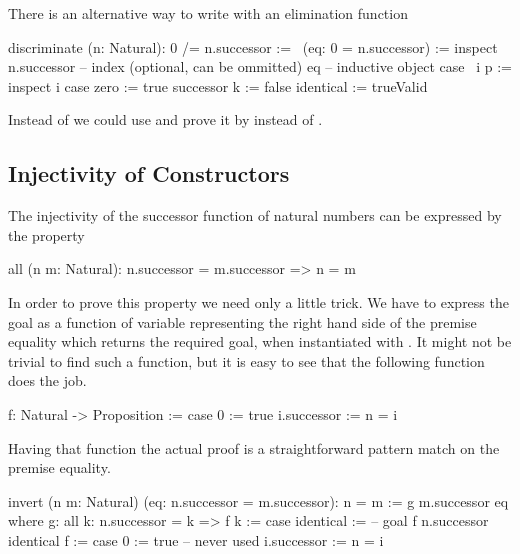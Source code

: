 There is an alternative way to write  with an elimination
function

\begin{alba}
    discriminate (n: Natural): 0 /= n.successor :=
        \ (eq: 0 = n.successor) :=
            inspect
                n.successor     -- index (optional, can be ommitted)
                eq              -- inductive object
            case
                {\ i p :=
                    inspect i case
                        zero := true
                        successor k := false}
                identical := trueValid
\end{alba}

Instead of  we could use  and
prove it by  instead of .




\subsection{Injectivity of Constructors}

The injectivity of the successor function of natural numbers can be expressed
by the property

\begin{alba}
    all (n m: Natural): n.successor = m.successor  =>  n = m
\end{alba}

In order to prove this property we need only a little trick. We have to
express the goal  as a function of variable representing the right
hand side of the premise equality which returns the required goal, when
instantiated with . It might not be trivial to find such a
function, but it is easy to see that the following function does the job.

\begin{alba}
    f: Natural -> Proposition :=
        case 0 :=
                true
             i.successor :=
                n = i
\end{alba}
%
Having that function the actual proof is a straightforward pattern match on the
premise equality.


\begin{alba}
    invert (n m: Natural) (eq: n.successor = m.successor): n = m
    :=
        g m.successor eq
        where
            g: all k: n.successor = k => f k :=
                case identical :=
                    -- goal f n.successor
                    identical
            f :=
                case
                    0 :=
                        true -- never used
                    i.successor :=
                        n = i
\end{alba}


